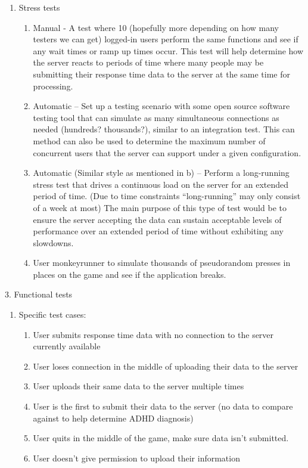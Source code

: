 \documentclass[a4wide]{article}
\begin{document}
\begin{enumerate}
\begin{enumerate}
\item	Stress tests
\begin{enumerate}
\item	Manual - A test where 10 (hopefully more depending on how many testers we can get) logged-in users perform the same functions and see if any wait times or ramp up times occur. This test will help determine how the server reacts to periods of time where many people may be submitting their response time data to the server at the same time for processing.
\item	Automatic – Set up a testing scenario with some open source software testing tool that can simulate as many simultaneous connections as needed (hundreds? thousands?), similar to an integration test. This can method can also be used to determine the maximum number of concurrent users that the server can support under a given configuration.
\item	Automatic (Similar style as mentioned in b) – Perform a long-running stress test that drives a continuous load on the server for an extended period of time.  (Due to time constraints “long-running” may only consist of a week at most) The main purpose of this type of test would be to ensure the server accepting the data can sustain acceptable levels of performance over an extended period of time without exhibiting any slowdowns.
\item	User monkeyrunner to simulate thousands of pseudorandom presses in places on the game and see if the application breaks.
\end{enumerate}
\end{enumerate}
3.	Functional tests
\begin{enumerate}
\item	Specific test cases:
\begin{enumerate}
\item	User submits response time data with no connection to the server currently available
\item	User loses connection in the middle of uploading their data to the server
\item	User uploads their same data to the server multiple times
\item	User is the first to submit their data to the server (no data to compare against to help determine ADHD diagnosis)
\item	User quits in the middle of the game, make sure data isn’t submitted.
\item	User doesn’t give permission to upload their information


\end{enumerate}
\end{enumerate}
\end{enumerate}
\end{document}
